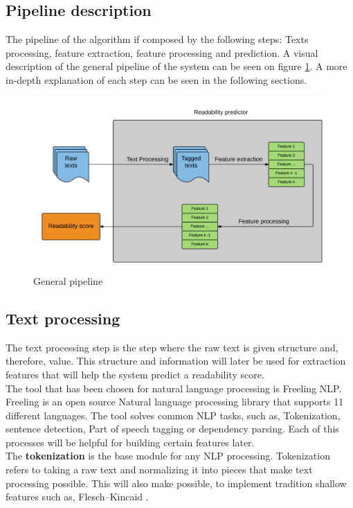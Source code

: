 \documentclass[12pt]{article}
\begin{document}
\subsection{Pipeline description}
The pipeline of the algorithm if composed by the following steps: Texts processing, feature extraction, feature processing and prediction. A visual description of the general pipeline of the system can be seen on figure \ref{fig:pipeline}.  A more in-depth explanation of each step can be seen in the following sections.

\begin{figure}[h]
\includegraphics[width=\textwidth]{pipeline}
\caption{General pipeline}
\label{fig:pipeline}
\end{figure}

\subsection{Text processing}

The text processing step is the step where the raw text is given structure and, therefore, value. This structure and information will later be used for extraction features that will help the system predict a readability score.\\

The tool that has been chosen for natural language processing is Freeling NLP\cite{freelingNLP}. Freeling is an open source Natural language processing library that supports 11 different languages. The tool solves common NLP tasks, such as, Tokenization, sentence detection, Part of speech tagging or dependency parsing. Each of this processes will be helpful for building certain features later.\\

The \textbf{tokenization} is the base module for any NLP processing. Tokenization refers to taking a raw text and normalizing it into pieces that make text processing possible. This will also make possible, to implement tradition shallow features such as, Flesch–Kincaid \cite{flesch}. \\
\end{document}
